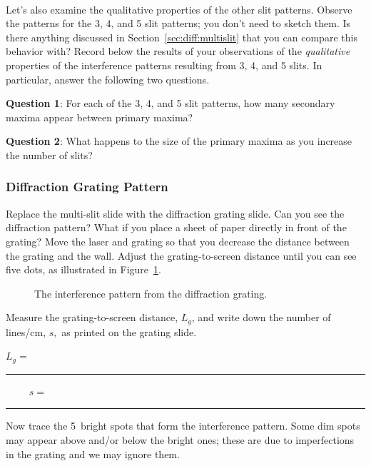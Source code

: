 \ \\
\noindent 
Let's also examine the qualitative properties of the other slit
patterns.  Observe the patterns for the 3, 4, and 5 slit patterns; you
don't need to sketch them.  Is there anything discussed in
Section~\ref{sec:diff:multislit} that you can compare this behavior
with?  Record below the results of your observations of the {\it
qualitative} properties of the interference patterns resulting from 3,
4, and 5 slits. In particular, answer the following two questions. 
\vspace*{.5cm}

\noindent 
{\bf Question 1}: For each of the 3, 4, and 5 slit patterns, how many
secondary maxima appear between primary maxima?
\vspace*{.8cm}

\noindent
{\bf Question 2}: What happens to the size of the primary maxima as you
increase the number of slits?\\








\subsubsection{Diffraction Grating Pattern} 

Replace the multi-slit slide with the diffraction grating slide.  Can you see
the diffraction pattern?  What if you place a sheet of paper directly in front
of the grating?  Move the laser and grating so that you decrease the distance
between the grating and the wall. Adjust the grating-to-screen distance until 
you can see five dots, as illustrated in Figure~\ref{fig:diff:diffgratpat}. 
\begin{figure}[htb]
\centerline{\epsfxsize=8cm }
\caption{The interference pattern from the diffraction grating.} 
\label{fig:diff:diffgratpat}
\end{figure}

\noindent
Measure the grating-to-screen distance, $L_g$, and write down the number of 
lines/cm, $s,$
as printed on the grating slide. 

\begin{center}
$L_g=$~ \rule{3cm}{.1mm} ~~~~ $s=$~ \rule{3cm}{.1mm}
\end{center}
\vspace*{.5cm}
\noindent  Now trace the 5~bright spots that form the 
interference pattern. Some dim spots may appear above and/or below the bright 
ones; these are due to imperfections in the grating and we may ignore them. \\

